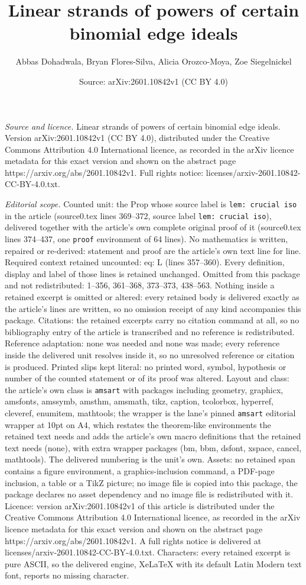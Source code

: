 \documentclass[10pt,a4paper]{amsart}
\title[Linear strands of powers of certain binomial edge ideals]{Linear strands of powers of certain binomial edge ideals}
\author{Abbas Dohadwala, Bryan Flores-Silva, Alicia Orozco-Moya, Zoe Siegelnickel}
\date{Source: arXiv:2601.10842v1 (CC BY 4.0)}
\begin{document}
\maketitle

\noindent\emph{Source and licence.} Linear strands of powers of certain binomial edge ideals. Version arXiv:2601.10842v1 (CC BY 4.0), distributed under the Creative Commons Attribution 4.0 International licence, as recorded in the arXiv licence metadata for this exact version and shown on the abstract page https://arxiv.org/abs/2601.10842v1. Full rights notice: licenses/arxiv-2601.10842-CC-BY-4.0.txt.\par\smallskip

\noindent\textit{Editorial scope.} Counted unit: the Prop whose source label is \texttt{lem: crucial iso} in the article (source0.tex lines 369--372, source label \texttt{lem: crucial iso}), delivered together with the article's own complete original proof of it (source0.tex lines 374--437, one \texttt{proof} environment of 64 lines). No mathematics is written, repaired or re-derived: statement and proof are the article's own text line for line. Required context retained uncounted: eq: L (lines 357--360). Every definition, display and label of those lines is retained unchanged. Omitted from this package and not redistributed: 1--356, 361--368, 373--373, 438--563. Nothing inside a retained excerpt is omitted or altered: every retained body is delivered exactly as the article's lines are written, so no omission receipt of any kind accompanies this package. Citations: the retained excerpts carry no citation command at all, so no bibliography entry of the article is transcribed and no reference is redistributed. Reference adaptation: none was needed and none was made; every reference inside the delivered unit resolves inside it, so no unresolved reference or citation is produced. Printed slips kept literal: no printed word, symbol, hypothesis or number of the counted statement or of its proof was altered. Layout and class: the article's own class is \texttt{amsart} with packages including geometry, graphicx, amsfonts, amssymb, amsthm, amsmath, tikz, caption, tcolorbox, hyperref, cleveref, enumitem, mathtools; the wrapper is the lane's pinned \texttt{amsart} editorial wrapper at 10pt on A4, which restates the theorem-like environments the retained text needs and adds the article's own macro definitions that the retained text needs (none), with extra wrapper packages (bm, bbm, dsfont, xspace, cancel, mathtools). The delivered numbering is the unit's own. Assets: no retained span contains a figure environment, a graphics-inclusion command, a PDF-page inclusion, a table or a TikZ picture; no image file is copied into this package, the package declares no asset dependency and no image file is redistributed with it. Licence: version arXiv:2601.10842v1 of this article is distributed under the Creative Commons Attribution 4.0 International licence, as recorded in the arXiv licence metadata for this exact version and shown on the abstract page https://arxiv.org/abs/2601.10842v1. A full rights notice is delivered at licenses/arxiv-2601.10842-CC-BY-4.0.txt. Characters: every retained excerpt is pure ASCII, so the delivered engine, XeLaTeX with its default Latin Modern text font, reports no missing character.
\end{document}
